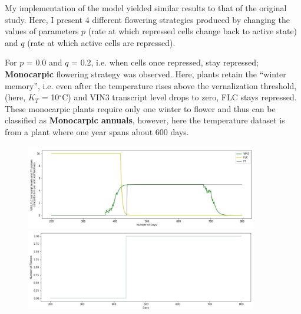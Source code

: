 \documentclass[10 pt]{article}
\begin{document}
My implementation of the model yielded similar results to that of the original study. Here, I present 4 different flowering strategies produced by changing the values of parameters $p$ (rate at which repressed cells change back to active state) and $q$ (rate at which active cells are repressed).

For $p$ = 0.0 and $q$ = 0.2, i.e. when cells once repressed, stay repressed; \textbf{Monocarpic} flowering strategy was observed. Here, plants retain the ``winter memory'', i.e. even after the temperature rises above the vernalization threshold, (here, $K_{T}$ = 10$^{\circ}$C) and VIN3 transcript level drops to zero, FLC stays repressed. These monocarpic plants require only one winter to flower and thus can be classified as \textbf{Monocarpic annuals}, however, here the temperature dataset is from a plant where one year spans about 600 days. 
\begin{figure}[h]
\includegraphics[width=0.9\textwidth, left]{annual_vin-flc.png}
\includegraphics[width=0.9\textwidth]{annual_flowering.png}
\end{figure}
\pagebreak
\end{document}
